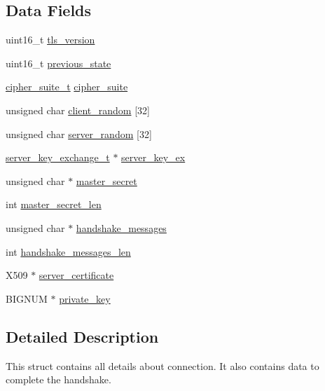 \subsection*{Data Fields}
\begin{DoxyCompactItemize}
\item 
uint16\+\_\+t \hyperlink{struct_t_l_s__parameters__t_a8fd63193690a09b75e0aaf9b971ed3df}{tls\+\_\+version}
\item 
uint16\+\_\+t \hyperlink{struct_t_l_s__parameters__t_a7876cd7f12771bb13dfd180e2d74e02b}{previous\+\_\+state}
\item 
\hyperlink{structcipher__suite__t}{cipher\+\_\+suite\+\_\+t} \hyperlink{struct_t_l_s__parameters__t_af1d8ebe57a775be2b91550dbcacb2a58}{cipher\+\_\+suite}
\item 
unsigned char \hyperlink{struct_t_l_s__parameters__t_adbdca8d573a8e073ef16bf14229fb4c9}{client\+\_\+random} \mbox{[}32\mbox{]}
\item 
unsigned char \hyperlink{struct_t_l_s__parameters__t_a9159f146fbc286a8b55f4aa83396ae2f}{server\+\_\+random} \mbox{[}32\mbox{]}
\item 
\hyperlink{_server_client_key_exchange_8h_a0e7e73056ef40d5a7b303b385dee59cd}{server\+\_\+key\+\_\+exchange\+\_\+t} $\ast$ \hyperlink{struct_t_l_s__parameters__t_ad79527a4a6a3547cc16f0fb569767d9d}{server\+\_\+key\+\_\+ex}
\item 
unsigned char $\ast$ \hyperlink{struct_t_l_s__parameters__t_a68c2015df5cb7259aa1abdee33c8e6f3}{master\+\_\+secret}
\item 
int \hyperlink{struct_t_l_s__parameters__t_a7112487b636ca7921055d94ae02478fe}{master\+\_\+secret\+\_\+len}
\item 
unsigned char $\ast$ \hyperlink{struct_t_l_s__parameters__t_ac6734c87e703c22f7d34f71ca116d005}{handshake\+\_\+messages}
\item 
int \hyperlink{struct_t_l_s__parameters__t_afbdbb7d32255aef8951f95ccc44957fc}{handshake\+\_\+messages\+\_\+len}
\item 
X509 $\ast$ \hyperlink{struct_t_l_s__parameters__t_a832ae425d6bb6330e1e5e825ab85ac31}{server\+\_\+certificate}
\item 
B\+I\+G\+N\+UM $\ast$ \hyperlink{struct_t_l_s__parameters__t_aa7d109714bb4c1faa6aba18c0dd3dcae}{private\+\_\+key}
\end{DoxyCompactItemize}


\subsection{Detailed Description}
This struct contains all details about connection. It also contains data to complete the handshake. 

